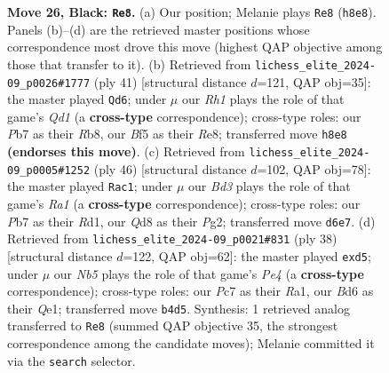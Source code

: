 \documentclass[11pt]{article}
\begin{document}
\begin{figure}[p]
\caption{\textbf{Move 26, Black: \texttt{Re8}.} (a) Our position; Melanie plays \texttt{Re8} (\texttt{h8e8}). Panels (b)--(d) are the retrieved master positions whose correspondence most drove this move (highest QAP objective among those that transfer to it). (b) Retrieved from \texttt{lichess\_elite\_2024-09\_p0026\#1777} (ply 41) [structural distance $d$=121, QAP obj=35]: the master played \texttt{Qd6}; under $\mu$ our \emph{Rh1} plays the role of that game's \emph{Qd1} (a \textbf{cross-type} correspondence); cross-type roles: our \emph{P}b7 as their \emph{R}b8, our \emph{B}f5 as their \emph{R}e8; transferred move \texttt{h8e8} \textbf{(endorses this move)}. (c) Retrieved from \texttt{lichess\_elite\_2024-09\_p0005\#1252} (ply 46) [structural distance $d$=102, QAP obj=78]: the master played \texttt{Rac1}; under $\mu$ our \emph{Bd3} plays the role of that game's \emph{Ra1} (a \textbf{cross-type} correspondence); cross-type roles: our \emph{P}b7 as their \emph{R}d1, our \emph{Q}d8 as their \emph{P}g2; transferred move \texttt{d6e7}. (d) Retrieved from \texttt{lichess\_elite\_2024-09\_p0021\#831} (ply 38) [structural distance $d$=122, QAP obj=62]: the master played \texttt{exd5}; under $\mu$ our \emph{Nb5} plays the role of that game's \emph{Pe4} (a \textbf{cross-type} correspondence); cross-type roles: our \emph{P}c7 as their \emph{R}a1, our \emph{B}d6 as their \emph{Q}e1; transferred move \texttt{b4d5}. Synthesis: 1 retrieved analog transferred to \texttt{Re8} (summed QAP objective 35, the strongest correspondence among the candidate moves); Melanie committed it via the \texttt{search} selector.}
\label{fig:thought-m51}
\end{figure}

\clearpage
\end{document}
